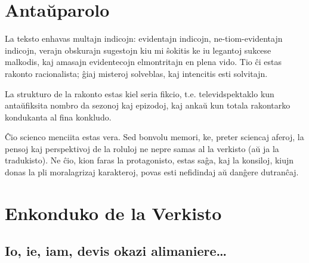 \chapter*{Antaŭparolo}

La teksto enhavas multajn indicojn: evidentajn indicojn, ne-tiom-evidentajn indicojn, verajn obskurajn sugestojn kiu mi ŝokitis ke iu legantoj sukcese malkodis, kaj amasajn evidentecojn elmontritajn en plena vido. Tio ĉi estas rakonto racionalista; ĝiaj misteroj solveblas, kaj intencitis esti solvitajn.

La strukturo de la rakonto estas kiel seria fikcio, t.e. televidspektaklo kun antaŭfiksita nombro da sezonoj kaj epizodoj, kaj ankaŭ kun totala rakontarko kondukanta al fina konkludo.


Ĉio scienco menciita estas vera. Sed bonvolu memori, ke, preter sciencaj aferoj, la pensoj kaj perspektivoj de la roluloj ne nepre samas al la verkisto (aŭ ja la tradukisto). Ne ĉio, kion faras la protagonisto, estas saĝa, kaj la konsiloj, kiujn donas la pli moralagrizaj karakteroj, povas esti nefidindaj aŭ danĝere dutranĉaj.

\chapter*{Enkonduko de la Verkisto}

\section*{Io, ie, iam, devis okazi alimaniere…}

